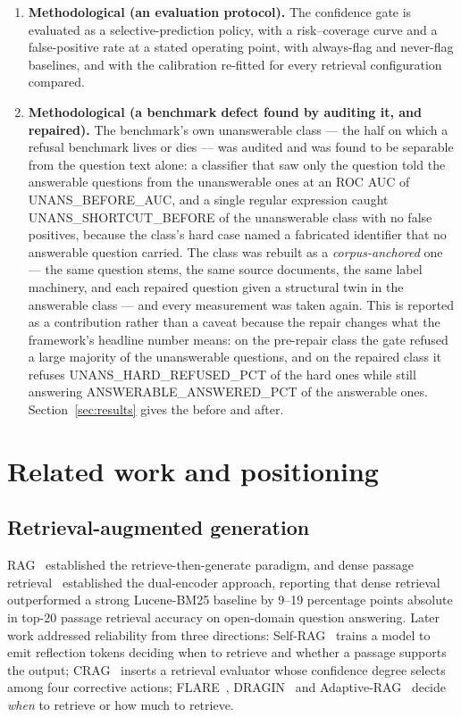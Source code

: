 \documentclass[preprint,3p,times]{elsarticle}
\begin{document}
\begin{enumerate}
detection alone.
\item \textbf{Methodological (an evaluation protocol).} The confidence gate is
evaluated as a selective-prediction policy, with a risk--coverage curve and a
false-positive rate at a stated operating point, with always-flag and
never-flag baselines, and with the calibration re-fitted for every retrieval
configuration compared.
\item \textbf{Methodological (a benchmark defect found by auditing it, and
repaired).} The benchmark's own unanswerable class --- the half on which a
refusal benchmark lives or dies --- was audited and was found to be separable
from the question text alone: a classifier that saw only the question told the
answerable questions from the unanswerable ones at an ROC AUC of
{{UNANS_BEFORE_AUC}}, and a single regular expression caught
{{UNANS_SHORTCUT_BEFORE}} of the unanswerable class with no false positives,
because the class's hard case named a fabricated identifier that no answerable
question carried. The class was rebuilt as a \emph{corpus-anchored} one ---
the same question stems, the same source documents, the same label
machinery, and each repaired question given a structural twin in the
answerable class --- and every measurement was taken again. This is reported
as a contribution rather than a caveat because the repair changes what the
framework's headline number means: on the pre-repair class the gate refused
a large majority of the unanswerable questions, and on the repaired class it
refuses {{UNANS_HARD_REFUSED_PCT}} of the hard ones while still answering
{{ANSWERABLE_ANSWERED_PCT}} of the answerable ones. Section~\ref{sec:results}
gives the before and after.
\end{enumerate}

\section{Related work and positioning}
\label{sec:related}

\subsection{Retrieval-augmented generation}

RAG~\cite{lewis2020rag} established the retrieve-then-generate paradigm, and
dense passage retrieval~\cite{karpukhin2020dpr} established the dual-encoder
approach, reporting that dense retrieval outperformed a strong Lucene-BM25
baseline by 9--19 percentage points absolute in top-20 passage retrieval
accuracy on open-domain question answering. Later work addressed reliability
from three directions: Self-RAG~\cite{asai2024selfrag} trains a model to emit
reflection tokens deciding when to retrieve and whether a passage supports the
output; CRAG~\cite{yan2024crag} inserts a retrieval evaluator whose confidence
degree selects among four corrective actions; FLARE~\cite{jiang2023flare},
DRAGIN~\cite{su2024dragin} and Adaptive-RAG~\cite{jeong2024adaptive} decide
\emph{when} to retrieve or how much to retrieve.
\end{document}
